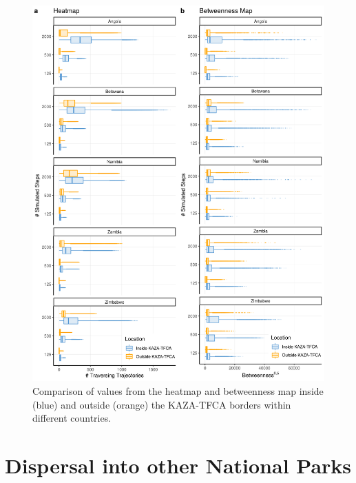 \documentclass[../FinalThesis.tex]{subfiles}
\begin{document}
\begin{figure}[hbtp]
 \begin{center}
  \includegraphics[width = \textwidth]{Figures/MapComparisonCountries.png}
  \caption{Comparison of values from the heatmap and betweenness map inside
  (blue) and outside (orange) the KAZA-TFCA borders within different countries.}
  \label{MapComparisonCountries}
 \end{center}
\end{figure}

\newpage
\section{Dispersal into other National Parks}
\end{document}
